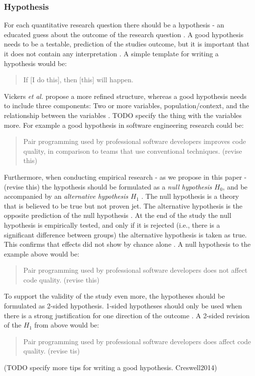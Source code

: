 \subsubsection{Hypothesis}

For each quantitative research question there should be a hypothesis - an educated guess about the outcome of the research question \cite{Buddies2010,Farrugia2009}. A good hypothesis needs to be a testable, prediction of the studies outcome, but it is important that it does not contain any interpretation \cite{Prasad2001}. A simple template for writing a hypothesis would be:
\begin{quote}
	If [I do this], then [this] will happen. \cite{Buddies2010}
\end{quote}
Vickers \emph{et al.} propose a more refined structure, whereas a good hypothesis needs to include three components: Two or more variables, population/context, and the relationship between the variables \cite{Vickers}. {\color{red} TODO specify the thing with the variables more.} For example a good hypothesis in software engineering research could be: 
\begin{quote}
	{\color{red}Pair programming used by professional software developers improves code quality, in comparison to teams that use conventional techniques. (revise this)}
\end{quote}
Furthermore, when conducting empirical research {\color{red}- as we propose in this paper - (revise this)} the hypothesis should be formulated as a \emph{null hypothesis $H_0$}, and be accompanied by an \emph{alternative hypothesis $H_1$} \cite{Farrugia2009}. The null hypothesis is a theory that is believed to be true but not proven jet. The alternative hypothesis is the opposite prediction of the null hypothesis \cite{Prasad2001}. At the end of the study the null hypothesis is empirically tested, and only if it is rejected (i.e., there is a significant difference between groups) the alternative hypothesis is taken as true. This confirms that effects did not show by chance alone \cite{Farrugia2009}. A null hypothesis to the example above would be:
\begin{quote}
	{\color{red}Pair programming used by professional software developers does not affect code quality. (revise this)}
\end{quote}
To support the validity of the study even more, the hypotheses should be formulated as 2-sided hypothesis. \cite[p.280]{Farrugia2009} 1-sided hypotheses should only be used when there is a strong justification for one direction of the outcome \cite{Farrugia2009}. A 2-sided revision of the $H_1$ from above would be: 
\begin{quote}
	{\color{red}Pair programming used by professional software developers does affect code quality. (revise tis)}	
\end{quote}
{\color{red}(TODO specify more tips for writing a good hypothesis. Creswell2014)}  